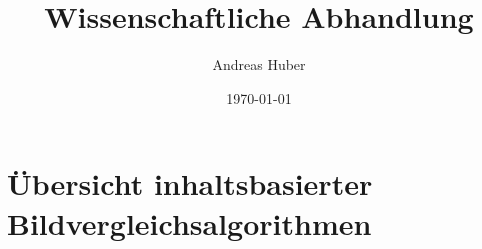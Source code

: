 \documentclass[a4paper,12pt]{article}
\title{Wissenschaftliche Abhandlung}
\author{Andreas Huber}
\date{\today}
\begin{document}

\newpage


\tableofcontents

\newpage


\newpage
{}



\section{Übersicht inhaltsbasierter Bildvergleichsalgorithmen}



\newpage













\newpage


% 
\end{document}
